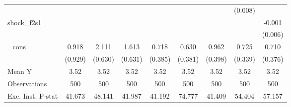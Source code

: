 {\begin{tabular}{l*{8}{c}}
            &                     &                     &                     &                     &                     &                     &     (0.008)         &                     \\
\addlinespace
shock\_f2s1  &                     &                     &                     &                     &                     &                     &                     &      -0.001         \\
            &                     &                     &                     &                     &                     &                     &                     &     (0.006)         \\
\addlinespace
\_cons      &       0.918         &       2.111\sym{***}&       1.613\sym{**} &       0.718\sym{*}  &       0.630         &       0.962\sym{**} &       0.725\sym{**} &       0.710\sym{*}  \\
            &     (0.929)         &     (0.630)         &     (0.631)         &     (0.385)         &     (0.381)         &     (0.398)         &     (0.339)         &     (0.376)         \\
\midrule
Mean Y      &        3.52         &        3.52         &        3.52         &        3.52         &        3.52         &        3.52         &        3.52         &        3.52         \\
Observations&         500         &         500         &         500         &         500         &         500         &         500         &         500         &         500         \\
Exc. Inst. F-stat&      41.673         &      48.141         &      41.987         &      41.192         &      74.777         &      41.409         &      54.404         &      57.157         \\
\bottomrule
\end{tabular}
}
